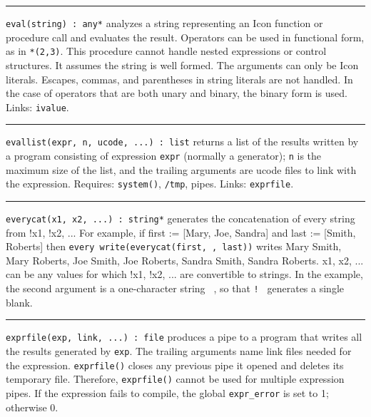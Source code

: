 \vspace{0.25cm}\hrule{}

\texttt{eval(string) : any*} analyzes a string
representing an Icon function or procedure call and evaluates the
result. Operators can be used in functional form, as in
\texttt{{\textquotedbl}*(2,3){\textquotedbl}}. This procedure cannot
handle nested expressions or control structures. It assumes the string
is well formed. The arguments can only be Icon literals. Escapes,
commas, and parentheses in string literals are not handled. In the case
of operators that are both unary and binary, the binary form is used.
Links: \texttt{ivalue}. 

\vspace{0.25cm}\hrule{}

\texttt{evallist(expr, n, ucode, ...) : list} 
returns a list of the results written by a program consisting of expression
\texttt{expr} (normally a
generator); \texttt{n} is the maximum size of the list, and the
trailing arguments are ucode files to link with the expression.
Requires: \texttt{system()}, \texttt{/tmp}, pipes. Links:
\texttt{exprfile}. 

\vspace{0.25cm}\hrule{}

\texttt{everycat(x1, x2, ...) : string*} generates the concatenation of
every string from !x1, !x2, ... For example, if first :=
[{\textquotedbl}Mary{\textquotedbl}, {\textquotedbl}Joe{\textquotedbl},
{\textquotedbl}Sandra{\textquotedbl}] and last :=
[{\textquotedbl}Smith{\textquotedbl},
{\textquotedbl}Roberts{\textquotedbl}] then \texttt{every
write(everycat(first, {\textquotedbl} {\textquotedbl}, last))} writes
Mary Smith, Mary Roberts, Joe Smith, Joe Roberts, Sandra Smith, Sandra
Roberts. x1, x2, ... can be any values for which !x1, !x2, ... are
convertible to strings. In the example, the second
argument is a one-character string \texttt{{\textquotedbl}
{\textquotedbl}}, so that \texttt{!{\textquotedbl} {\textquotedbl}}
generates a single blank. 

\vspace{0.25cm}\hrule{}

\texttt{exprfile(exp, link, ...) : file} produces a pipe to a program
that writes all the results generated by \texttt{exp}. The trailing
arguments name link files needed for the expression.
\texttt{exprfile()} closes any previous pipe it opened and deletes its
temporary file. Therefore, \texttt{exprfile()} cannot be used for
multiple expression pipes. If the expression fails to compile, the
global \texttt{expr\_error} is set to 1; otherwise 0. 

